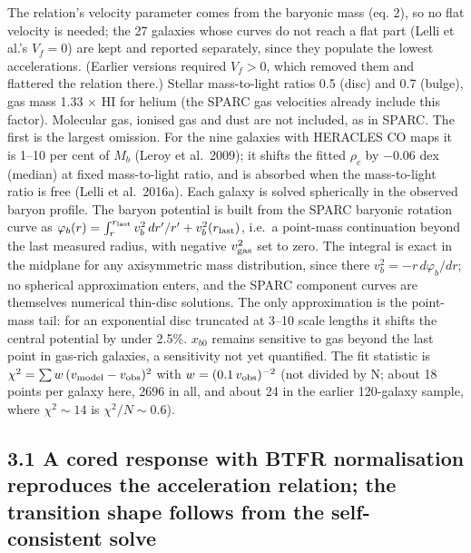 \documentclass[
  10pt,
]{article}
\begin{document}
The relation's velocity parameter comes from the baryonic mass (eq. 2), so no flat velocity is needed; the 27 galaxies whose curves do not reach a flat part (Lelli et al.'s $V_f=0$) are kept and reported separately, since they populate the lowest accelerations. (Earlier versions required $V_f>0$, which removed them and flattered the relation there.) Stellar mass-to-light ratios 0.5 (disc) and 0.7 (bulge), gas mass 1.33 $\times$ HI for helium (the SPARC gas velocities already include this factor). Molecular gas, ionised gas and dust are not included, as in SPARC. The first is the largest omission. For the nine galaxies with HERACLES CO maps it is 1--10 per cent of $M_b$ (Leroy et al.~2009); it shifts the fitted $\rho_c$ by $-0.06$ dex (median) at fixed mass-to-light ratio, and is absorbed when the mass-to-light ratio is free (Lelli et al.~2016a). Each galaxy is solved spherically in the observed baryon profile. The baryon potential is built from the SPARC baryonic rotation curve as $\varphi_b(r)=\int_r^{r_{\rm last}}v_b^2\,dr'/r'+v_b^2(r_{\rm last})$, i.e.\ a point-mass continuation beyond the last measured radius, with negative $v_{\rm gas}^2$ set to zero. The integral is exact in the midplane for any axisymmetric mass distribution, since there $v_b^2=-r\,d\varphi_b/dr$; no spherical approximation enters, and the SPARC component curves are themselves numerical thin-disc solutions. The only approximation is the point-mass tail: for an exponential disc truncated at 3--10 scale lengths it shifts the central potential by under 2.5\%. $x_{b0}$ remains sensitive to gas beyond the last point in gas-rich galaxies, a sensitivity not yet quantified. The fit statistic is $\chi^2=\sum w\,(v_{\rm model}-v_{\rm obs})^2$ with $w=(0.1\,v_{\rm obs})^{-2}$ (not divided by N; about 18 points per galaxy here, 2696 in all, and about 24 in the earlier 120-galaxy sample, where $\chi^2\sim 14$ is $\chi^2/N\sim 0.6$).

\subsection{3.1 A cored response with BTFR normalisation reproduces the acceleration relation; the transition shape follows from the self-consistent solve}\label{a-cored-isothermal-response-with-btfr-normalisation-reproduces-the-acceleration-relation-the-transition-shape-is-the-output}
\end{document}
